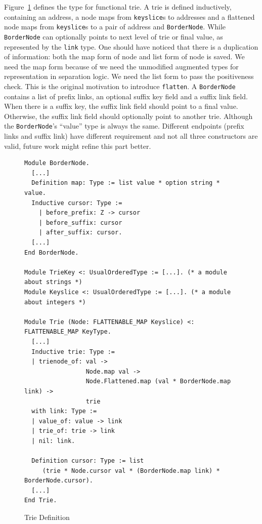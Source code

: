 \documentclass[runningheads]{llncs}
\begin{document}
Figure~\ref{fig:typedef} defines the type for functional trie. A trie is defined
inductively, containing an address, a node maps from \texttt{keyslice}s to
addresses and a flattened node maps from \texttt{keyslice}s to a pair of
address and \texttt{BorderNode}. While \texttt{BorderNode} can optionally points
to next level of trie or final value, as represented by the \texttt{link} type.
One should have noticed that there is a duplication of information: both the
map form of node and list form of node is saved. We need the map form
because of we need the unmodified augmented types for representation in
separation logic. We need the list form to pass the positiveness check. This is
the original motivation to introduce \texttt{flatten}. A \texttt{BorderNode}
contains a list of prefix links, an optional suffix key field and a suffix link
field. When there is a suffix key, the suffix link field should point to a final
value. Otherwise, the suffix link field should optionally point to another trie.
Although the \texttt{BorderNode}'s ``value'' type is always the same. Different
endpoints (prefix links and suffix link) have different requirement and not all
three constructors are valid, future work might refine this part better.


\begin{figure}[htbp]
  \centering
\begin{verbatim}
Module BorderNode.
  [...]
  Definition map: Type := list value * option string * value.
  Inductive cursor: Type :=
    | before_prefix: Z -> cursor
    | before_suffix: cursor
    | after_suffix: cursor.
  [...]
End BorderNode.

Module TrieKey <: UsualOrderedType := [...]. (* a module about strings *)
Module Keyslice <: UsualOrderedType := [...]. (* a module about integers *)

Module Trie (Node: FLATTENABLE_MAP Keyslice) <: FLATTENABLE_MAP KeyType.
  [...]
  Inductive trie: Type :=
  | trienode_of: val ->
                 Node.map val ->
                 Node.Flattened.map (val * BorderNode.map link) ->
                 trie
  with link: Type :=
  | value_of: value -> link
  | trie_of: trie -> link
  | nil: link.

  Definition cursor: Type := list
     (trie * Node.cursor val * (BorderNode.map link) * BorderNode.cursor).
  [...]
End Trie.
\end{verbatim}
  \caption{Trie Definition}\label{fig:typedef}
\end{figure}
\end{document}
